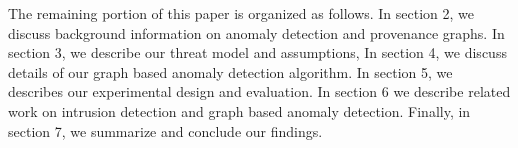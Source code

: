 The remaining portion of this paper is organized as follows. In section 2, we discuss background information on anomaly detection and provenance graphs. In section 3, we describe our threat model and assumptions, In section 4, we discuss details of our graph based anomaly detection algorithm. In section 5, we describes our experimental design and evaluation. In section 6 we describe related work on intrusion detection and graph based anomaly detection. Finally, in section 7, we summarize and conclude our findings.





